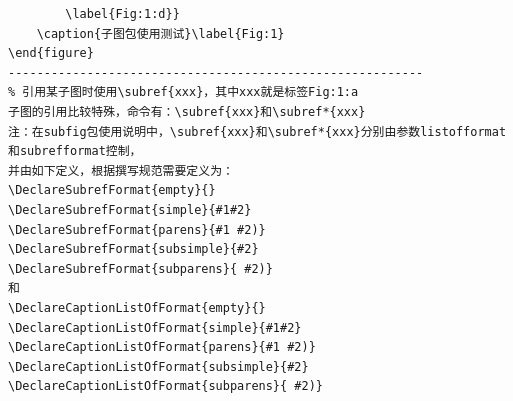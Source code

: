 \begin{lstlisting}
		\label{Fig:1:d}}
	\caption{子图包使用测试}\label{Fig:1}
\end{figure}
----------------------------------------------------------
% 引用某子图时使用\subref{xxx}，其中xxx就是标签Fig:1:a
子图的引用比较特殊，命令有：\subref{xxx}和\subref*{xxx}
注：在subfig包使用说明中，\subref{xxx}和\subref*{xxx}分别由参数listofformat和subrefformat控制，
并由如下定义，根据撰写规范需要定义为：
\DeclareSubrefFormat{empty}{}
\DeclareSubrefFormat{simple}{#1#2}
\DeclareSubrefFormat{parens}{#1 #2)}
\DeclareSubrefFormat{subsimple}{#2}
\DeclareSubrefFormat{subparens}{ #2)}
和
\DeclareCaptionListOfFormat{empty}{}
\DeclareCaptionListOfFormat{simple}{#1#2}
\DeclareCaptionListOfFormat{parens}{#1 #2)}
\DeclareCaptionListOfFormat{subsimple}{#2}
\DeclareCaptionListOfFormat{subparens}{ #2)}
\end{lstlisting}
\begin{figure}[!h]
	\centering
	\\ %
\end{figure}
